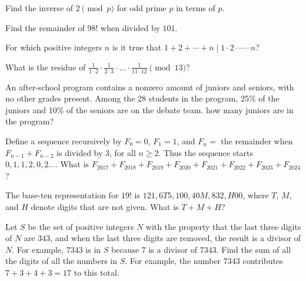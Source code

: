 \documentclass[mast]{lucky}
\begin{document}
\begin{prob}[]{1}
Find the inverse of $2\pmod {p}$ for odd prime $p$ in terms of $p.$
\end{prob}
    
\begin{prob}[]{1}
Find the remainder of $98!$ when divided by $101.$
\end{prob}

\begin{prob}{2}
For which positive integers $n$ is it true that $1+2+\cdots+n\mid 1\cdot 2\cdot \cdots \cdot n$?
\end{prob}

\begin{prob}[]{2}
What is the residue of $\frac{1}{1\cdot 2}\cdot \frac{1}{2\cdot 3}\cdot \dots \cdot \frac{1}{11\cdot 12}\pmod {13}?$
\end{prob}

\begin{prob}{2}
An after-school program contains a nonzero amount of juniors and seniors, with no other grades present. Among the 28 students in the program, 25\% of the juniors and 10\% of the seniors are on the debate team. how many juniors are in the program?
\end{prob}

\begin{prob}[AMC 10A 2017/13]{3}
Define a sequence recursively by $F_0 = 0$, $F_1 = 1$, and $F_n = $ the remainder when $F_{n-1} + F_{n-2}$ is divided by $3$, for all $n \ge 2$. Thus the sequence starts $0,1,1,2,0,2 \ldots$. What is $F_{2017} + F_{2018} + F_{2019} + F_{2020} + F_{2021} + F_{2022} + F_{2023} + F_{2024}$?
\end{prob}

\begin{req}[AMC 10B 2019/14]{4}
The base-ten representation for $19!$ is $121,6T5,100,40M,832,H00$, where $T$, $M$, and $H$ denote digits that are not given. What is $T+M+H$?
\end{req}

\begin{prob}{4}
Let $S$ be the set of positive integers $N$ with the property that the last three digits of $N$ are $343$, and when the last three digits are removed, the result is a divisor of $N$. For example, $7343$ is in $S$ because $7$ is a divisor of $7343$. Find the sum of all the digits of all the numbers in $S$. For example, the number $7343$ contributes $7+3+4+3=17$ to this total.
\end{prob}
\end{document}
